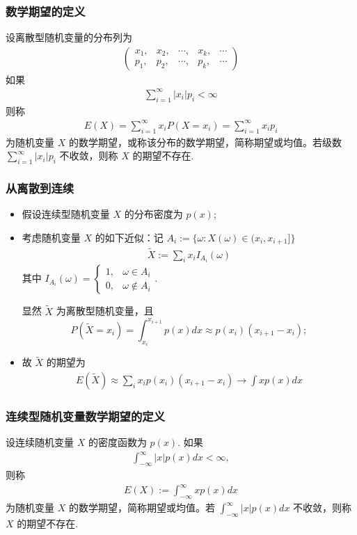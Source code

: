 \begin{frame}
	\frametitle{数学期望的定义}
	\begin{defi}
		设离散型随机变量的分布列为 \begin{eqnarray*}
			\left(\begin{array}{ccccc}
				x_1,&x_2, &\cdots, &x_k, &\cdots\\
				p_1,&p_2, &\cdots, &p_k, &\cdots
			\end{array}\right)
		\end{eqnarray*}
		如果
		\begin{eqnarray*}
			\sum_{i=1}^\infty|x_i|p_i<\infty
		\end{eqnarray*}
		则称
		\begin{eqnarray*}
			E(X)=\sum_{i=1}^\infty x_iP(X=x_i)=\sum_{i=1}^\infty x_ip_i
		\end{eqnarray*}
		为随机变量 $X$ 的数学期望，或称该分布的数学期望，简称期望或均值。若级数 $\sum_{i=1}^\infty|x_i|p_i$ 不收敛，则称 $X$ 的期望不存在.
	\end{defi}
\end{frame}
\begin{frame}
	\frametitle{从离散到连续}
	\begin{itemize}[<+-|alert@+>]
		\item 假设连续型随机变量 $X$ 的分布密度为 $p (x)$;
		\item 考虑随机变量 $X$ 的如下近似：记 $A_i:=\{\omega:X (\omega)\in (x_i, x_{i+1}]\}$
		\begin{eqnarray*}
			\tilde{X}:=\sum_{i}x_iI_{A_i}(\omega)
		\end{eqnarray*} 其中 $I_{A_i}(\omega)=\left\{
		\begin{array}{ll}
			1,& \omega\in A_i\\
			0,& \omega\notin A_i
		\end{array}\right.
		$.

		显然 $\tilde{X}$ 为离散型随机变量，且
		\[P(\tilde{X}=x_i)=\int_{x_i}^{x_{i+1}}p(x)dx\approx p(x_i)(x_{i+1}-x_i);\]
		\item 故 $\tilde{X}$ 的期望为
		\begin{eqnarray*}
			E(\tilde{X})\approx \sum_i x_ip(x_i)(x_{i+1}-x_i)\rightarrow \int xp(x)dx
		\end{eqnarray*}

	\end{itemize}
\end{frame}

\begin{frame}
	\frametitle{连续型随机变量数学期望的定义}
	\begin{defi}
		设连续随机变量 $X$ 的密度函数为 $p (x)$. 如果
		\begin{eqnarray*}
			\int_{-\infty}^{\infty}|x|p(x)dx<\infty,
		\end{eqnarray*}
		则称
		\begin{eqnarray*}
			E(X):=\int_{-\infty}^\infty xp(x)dx
		\end{eqnarray*}
		为随机变量 $X$ 的数学期望，简称期望或均值。若 $\int_{-\infty}^\infty|x|p (x) dx$ 不收敛，则称 $X$ 的期望不存在.
	\end{defi}
\end{frame}

